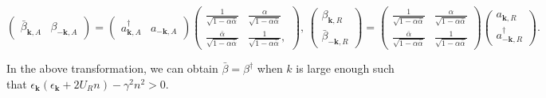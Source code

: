 \documentclass[aps,onecolumn,superscriptaddress,notitlepage,longbibliography]{revtex4-1}
\newcommand{\tmmathbf}[1]{\ensuremath{\boldsymbol{#1}}}
\begin{document}
\begin{equation}
\left(\begin{array}{cc}\bar{\beta}_{\tmmathbf{k}, A} &
  \beta_{- \tmmathbf{k}, A}\end{array}\right) = \left(\begin{array}{cc}a^{\dagger}_{\tmmathbf{k}, A} &
  a_{- \tmmathbf{k}, A}\end{array}\right)\left(\begin{array}{cc}
  \frac{1}{\sqrt{1 - \alpha \bar{\alpha}}} & \frac{\alpha}{\sqrt{1 - \alpha
  \bar{\alpha}}}\\
  \frac{\bar{\alpha}}{\sqrt{1 - \alpha \bar{\alpha}}} & \frac{1}{\sqrt{1 -
  \alpha \bar{\alpha}}},
  \end{array}\right), \,
  \left(\begin{array}{c}
    \beta_{\tmmathbf{k}, R}\\
    \bar{\beta}_{- \tmmathbf{k}, R}
  \end{array}\right) = \left(\begin{array}{cc}
    \frac{1}{\sqrt{1 - \alpha \bar{\alpha}}} & \frac{\alpha}{\sqrt{1 - \alpha
    \bar{\alpha}}}\\
    \frac{\bar{\alpha}}{\sqrt{1 - \alpha \bar{\alpha}}} & \frac{1}{\sqrt{1 -
    \alpha \bar{\alpha}}}
  \end{array}\right) \left(\begin{array}{c}
    a_{\tmmathbf{k}, R}\\
    a^{\dagger}_{- \tmmathbf{k}, R}
  \end{array}\right) .
\end{equation} 

In the above transformation, we can obtain $\bar{\beta}=\beta^\dagger$ when $k$ is large enough such that $\epsilon_{\tmmathbf{k}}(\epsilon_{\tmmathbf{k}}+2U_Rn)-\gamma^2n^2>0$.
\end{document}
